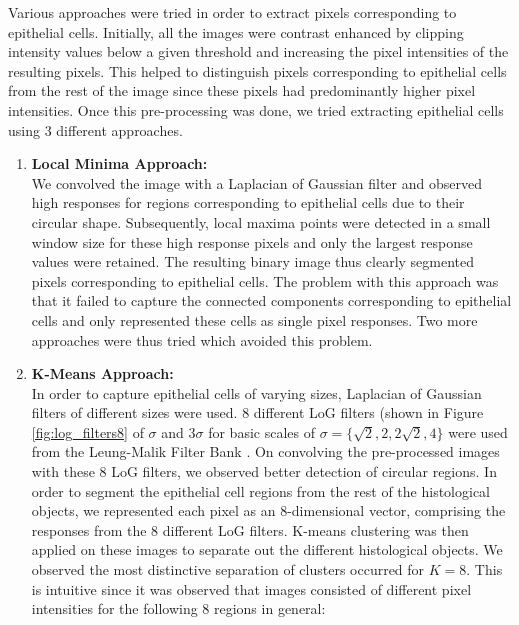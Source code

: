 Various approaches were tried in order to extract pixels corresponding to epithelial cells. Initially, all the images were contrast enhanced by clipping intensity values below a given threshold and increasing the pixel intensities of the resulting pixels. This helped to distinguish pixels corresponding to epithelial cells from the rest of the image since these pixels had predominantly higher pixel intensities. Once this pre-processing was done, we tried extracting epithelial cells using 3 different approaches.

\begin{enumerate}

\item \textbf{Local Minima Approach:}\\
We convolved the image with a Laplacian of Gaussian filter and observed high responses for regions corresponding to epithelial cells due to their circular shape. Subsequently, local maxima points were detected in a small window size for these high response pixels and only the largest response values were retained. The resulting binary image thus clearly segmented pixels corresponding to epithelial cells. The problem with this approach was that it failed to capture the connected components corresponding to epithelial cells and only represented these cells as single pixel responses. Two more approaches were thus tried which avoided this problem.

\item \textbf{K-Means Approach:}\\
In order to capture epithelial cells of varying sizes, Laplacian of Gaussian filters of different sizes were used. 8 different LoG filters (shown in Figure \ref{fig:log_filters8} of $\sigma$ and $3 \sigma$ for basic scales of $\sigma = \{\sqrt{2}, 2, 2\sqrt{2}, 4\}$ were used from the Leung-Malik Filter Bank \cite{lmfb}. On convolving the pre-processed images with these 8 LoG filters, we observed better detection of circular regions. In order to segment the epithelial cell regions from the rest of the histological objects, we represented each pixel as an 8-dimensional vector, comprising the responses from the 8 different LoG filters. K-means clustering was then applied on these images to separate out the different histological objects. We observed the most distinctive separation of clusters occurred for $K = 8$. This is intuitive since it was observed that images consisted of different pixel intensities for the following 8 regions in general:


\begin{enumerate}


\end{enumerate}
\end{enumerate}

